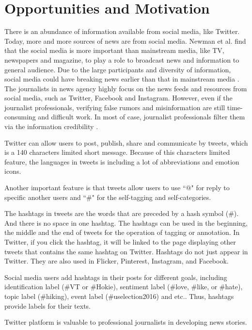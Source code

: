 
\section{Opportunities and Motivation}

There is an abundance of information available from social media, like Twitter. Today, more and more sources of news are from social media. Newman et al. \cite{Newman2011} find that the social media is more important than mainstream media, like TV, newspapers and magazine, to play a role to broadcast news and information to general audience. Due to the large participants and diversity of information, social media could have breaking news earlier than that in mainstream media \cite{Kwak2010}. The journalists in news agency highly focus on the news feeds and resources from social media, such as Twitter, Facebook and Instagram. However, even if the journalist professionals, verifying false rumors and misinformation are still time-consuming and difficult work. In most of case, journalist professionals filter them via the information credibility \cite{Silverman2014}. 

Twitter can allow users to post, publish, share and communicate by tweets, which is a 140 characters limited short message. Because of this characters limited feature, the languages in tweets is including a lot of abbreviations and emotion icons. 


Another important feature is that tweets allow users to use ``@" for reply to specific another users and ``\#" for the self-tagging and self-categories. 

The hashtags in tweets are the words that are preceded by a hash symbol (\#). And there is no space in one hashtag. The hashtags can be used in the beginning, the middle and the end of tweets for the operation of tagging or annotation. In Twitter, if you click the hashtag, it will be linked to the page displaying other tweets that contains the same hashtag on Twitter. Hashtags do not just appear in Twitter. They are also used in Flicker, Pinterest, Instagram, and Facebook. 


Social media users add hashtags in their posts for different goals, including identification label (\#VT or \#Hokie), sentiment label (\#love, \#like, or \#hate), topic label (\#hiking), event label (\#uselection2016) and etc.. Thus, hashtags provide labels for their texts.



Twitter platform is valuable to professional journalists in developing news stories. 

